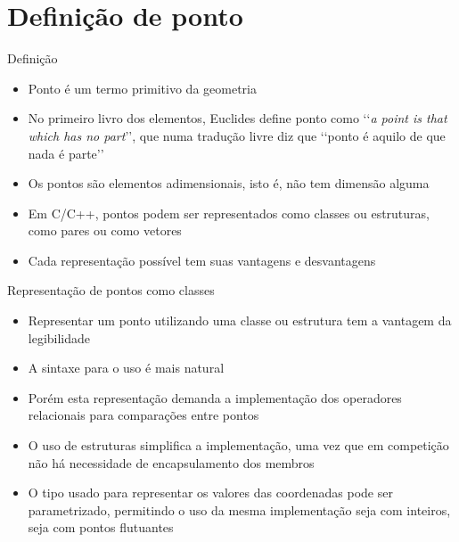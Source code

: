\section{Definição de ponto}

\begin{frame}[fragile]{Definição}

    \begin{itemize}
        \item Ponto é um termo primitivo da geometria

        \item No primeiro livro dos elementos, Euclides define ponto como 
            \lq\lq \textit{a point is that which has no part}\rq\rq, que numa tradução livre 
            diz que \lq\lq ponto é aquilo de que nada é parte\rq\rq

        \item Os pontos são elementos adimensionais, isto é, não tem dimensão alguma

        \item Em C/C++, pontos podem ser representados como classes ou estruturas, como
            pares ou como vetores

        \item Cada representação possível tem suas vantagens e desvantagens
   \end{itemize}

\end{frame}

\begin{frame}[fragile]{Representação de pontos como classes}

    \begin{itemize}
        \item Representar um ponto utilizando uma classe ou estrutura tem a vantagem da 
            legibilidade 

        \item A sintaxe para o uso é mais natural

        \item Porém esta representação demanda a implementação dos operadores relacionais 
            para comparações entre pontos

        \item O uso de estruturas simplifica a implementação, uma vez que em competição não há
            necessidade de encapsulamento dos membros

        \item O tipo usado para representar os valores das coordenadas pode ser parametrizado,
            permitindo o uso da mesma implementação seja com inteiros, seja com pontos
            flutuantes
    \end{itemize}

\end{frame}


